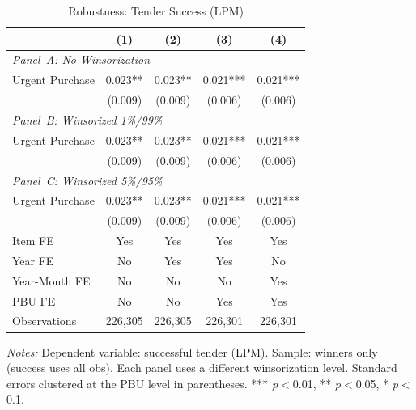 \begin{table}[ht]
  \centering
  \caption{Robustness: Tender Success (LPM)}
  \label{tab:rob_success}
  \small
  \begin{threeparttable}
  \begin{tabular}{lcccc}
    \hline\hline
    & (1) & (2) & (3) & (4) \\
    \hline
    \multicolumn{5}{l}{\textit{Panel~A: No Winsorization}} \\[3pt]
    Urgent Purchase & 0.023** & 0.023** & 0.021*** & 0.021*** \\
     & (0.009) & (0.009) & (0.006) & (0.006) \\[3pt]
    \hline
    \multicolumn{5}{l}{\textit{Panel~B: Winsorized 1\%/99\%}} \\[3pt]
    Urgent Purchase & 0.023** & 0.023** & 0.021*** & 0.021*** \\
     & (0.009) & (0.009) & (0.006) & (0.006) \\[3pt]
    \hline
    \multicolumn{5}{l}{\textit{Panel~C: Winsorized 5\%/95\%}} \\[3pt]
    Urgent Purchase & 0.023** & 0.023** & 0.021*** & 0.021*** \\
     & (0.009) & (0.009) & (0.006) & (0.006) \\[3pt]
    \hline
    Item FE & Yes & Yes & Yes & Yes \\
    Year FE & No & Yes & Yes & No \\
    Year-Month FE & No & No & No & Yes \\
    PBU FE & No & No & Yes & Yes \\
    Observations & 226,305 & 226,305 & 226,301 & 226,301 \\
    \hline\hline
  \end{tabular}
  \begin{tablenotes}
    \small
    \item \textit{Notes:} Dependent variable: successful tender (LPM). Sample: winners only (success uses all obs). Each panel uses a different winsorization level. Standard errors clustered at the PBU level in parentheses. *** \textit{p}$<$0.01, ** \textit{p}$<$0.05, * \textit{p}$<$0.1.
  \end{tablenotes}
  \end{threeparttable}
\end{table}
